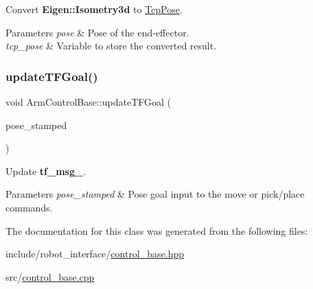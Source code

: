 Convert {\bfseries Eigen\+::\+Isometry3d} to \hyperlink{structTcpPose}{Tcp\+Pose}. 


\begin{DoxyParams}{Parameters}
{\em pose} & Pose of the end-\/effector. \\
\hline
{\em tcp\+\_\+pose} & Variable to store the converted result. \\
\hline
\end{DoxyParams}
\mbox{\label{classArmControlBase_a81f9e2c00abd1eb665e3cca3e11972ab}} 
\subsubsection{\texorpdfstring{update\+T\+F\+Goal()}{updateTFGoal()}}
{\footnotesize\ttfamily void Arm\+Control\+Base\+::update\+T\+F\+Goal (\begin{DoxyParamCaption}\item[{const geometry\+\_\+msgs\+::msg\+::\+Pose\+Stamped \&}]{pose\+\_\+stamped }\end{DoxyParamCaption})}



Update {\bfseries tf\+\_\+msg\+\_\+}. 


\begin{DoxyParams}{Parameters}
{\em pose\+\_\+stamped} & Pose goal input to the move or pick/place commands. \\
\hline
\end{DoxyParams}


The documentation for this class was generated from the following files\+:\begin{DoxyCompactItemize}
\item 
include/robot\+\_\+interface/\hyperlink{control__base_8hpp}{control\+\_\+base.\+hpp}\item 
src/\hyperlink{control__base_8cpp}{control\+\_\+base.\+cpp}\end{DoxyCompactItemize}

